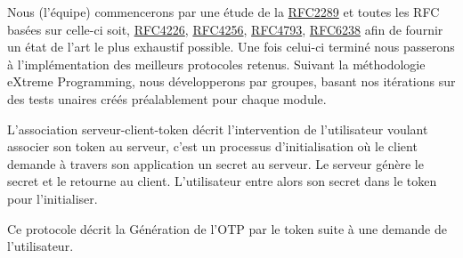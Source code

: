 \documentclass{"../../res/univ-projet"}
\begin{document}
Nous (l'équipe) commencerons par une étude de la \href{http://tools.ietf.org/html/rfc2289}{RFC2289} et toutes les RFC basées sur celle-ci
  soit, \href{http://tools.ietf.org/html/rfc4226}{RFC4226}, \href{http://tools.ietf.org/html/rfc4256}{RFC4256}, 
  \href{http://tools.ietf.org/html/rfc4793}{RFC4793}, \href{http://tools.ietf.org/html/rfc6238}{RFC6238} afin de fournir un état de l'art le plus exhaustif possible. Une fois celui-ci terminé nous passerons à
  l'implémentation des meilleurs protocoles retenus. Suivant la méthodologie eXtreme Programming, nous développerons par groupes, basant nos itérations sur des tests unaires créés préalablement pour chaque module.

  

\clearpage


\vspace{0.5cm}


L'association serveur-client-token décrit l'intervention de l'utilisateur voulant associer son token au serveur, c'est un processus d'initialisation où le client
demande à travers son application un secret au serveur. Le serveur génère le secret et le retourne au client. L'utilisateur entre alors son secret dans le token pour l'initialiser.

\vspace{1cm}



\vspace{0.5cm}


Ce protocole décrit la Génération de l'OTP par le token suite à une demande de l'utilisateur.
\\

\vspace{0.5cm}
\end{document}

